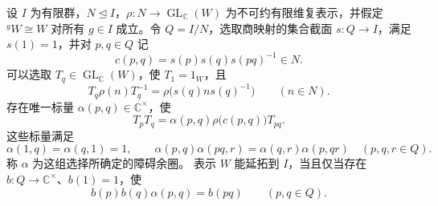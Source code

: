 \begin{theorem}[延拓的标量障碍]\label{b5:thm:extension-obstruction}
	设 \(I\) 为有限群，\(N\trianglelefteq I\)，\(\rho:N\to\operatorname{GL}_{\mathbb C}(W)\) 为不可约有限维复表示，并假定 \({}^gW\cong W\) 对所有 \(g\in I\) 成立。令 \(Q=I/N\)，选取商映射的集合截面 \(s:Q\to I\)，满足 \(s(1)=1\)，并对 \(p,q\in Q\) 记
	\[
		c(p,q)=s(p)s(q)s(pq)^{-1}\in N.
	\]
	可以选取 \(T_q\in\operatorname{GL}_{\mathbb C}(W)\)，使 \(T_1=1_W\)，且
	\begin{equation}\label{b5:eq:extension-intertwiner}
		T_q\rho(n)T_q^{-1} =\rho\bigl(s(q)ns(q)^{-1}\bigr)\qquad(n\in N).
	\end{equation}
	存在唯一标量 \(\alpha(p,q)\in\mathbb C^\times\)，使
	\begin{equation}\label{b5:eq:extension-factor}
		T_pT_q=\alpha(p,q)\rho\bigl(c(p,q)\bigr)T_{pq}.
	\end{equation}
	这些标量满足
	\begin{equation}\label{b5:eq:factor-cocycle}
		\alpha(1,q)=\alpha(q,1)=1,\qquad \alpha(p,q)\alpha(pq,r)=\alpha(q,r)\alpha(p,qr)\quad(p,q,r\in Q).
	\end{equation}
	称 \(\alpha\) 为这组选择所确定的障碍余圈。 表示 \(W\) 能延拓到 \(I\)，当且仅当存在 \(b:Q\to\mathbb C^\times\)、\(b(1)=1\)，使
	\begin{equation}\label{b5:eq:extension-rescaling}
		b(p)b(q)\alpha(p,q)=b(pq)\qquad(p,q\in Q).
	\end{equation}
\end{theorem}

